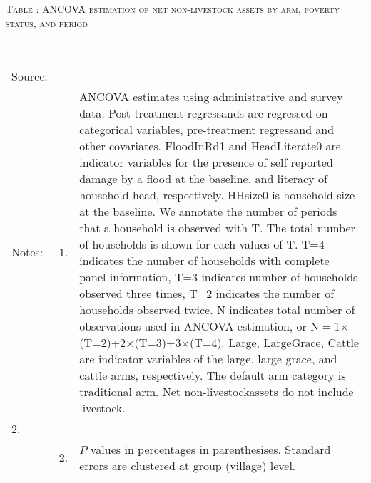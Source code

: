 \hspace{-1cm}\begin{minipage}[t]{14cm}
\hfil\textsc{\normalsize Table \thetable: ANCOVA estimation of net non-livestock assets by arm, poverty status, and period\label{tab ANCOVA NetNLAssets timevarying poverty status}}\\
\setlength{\tabcolsep}{1pt}
\setlength{\baselineskip}{8pt}
\renewcommand{\arraystretch}{.55}
\hfil{}\\
\renewcommand{\arraystretch}{.8}
\setlength{\tabcolsep}{1pt}
\begin{tabular}{>{\hfill\scriptsize}p{1cm}<{}>{\hfill\scriptsize}p{.25cm}<{}>{\scriptsize}p{12cm}<{\hfill}}
Source:& \multicolumn{2}{l}{\scriptsize Estimated with GUK administrative and survey data.}\\
Notes: & 1. & ANCOVA estimates using administrative and survey data. Post treatment regressands are regressed on categorical variables, pre-treatment regressand and other covariates. \textsf{FloodInRd1} and \textsf{HeadLiterate0} are indicator variables for the presence of self reported damage by a flood at the baseline, and literacy of household head, respectively. \textsf{HHsize0} is household size at the baseline. We annotate the number of periods that a household is observed with \textsf{T}. The total number of households is shown for each values of \textsf{T}. \textsf{T=4} indicates the number of households with complete panel information, \textsf{T=3} indicates number of households observed three times, \textsf{T=2} indicates the number of households observed twice. \textsf{N} indicates total number of observations used in ANCOVA estimation, or \textsf{N$=$1$\times$(T=2)+2$\times$(T=3)+3$\times$(T=4)}.  \textsf{Large}, \textsf{LargeGrace}, \textsf{Cattle} are indicator variables of the \textsf{large}, \textsf{large grace}, and \textsf{cattle} arms, respectively. The default arm category is \textsf{traditional} arm. Net non-livestockassets do not include livestock. \\
2.\\
& 2. & $P$ values in percentages in parenthesises. Standard errors are clustered at group (village) level.
\end{tabular}
\end{minipage}

